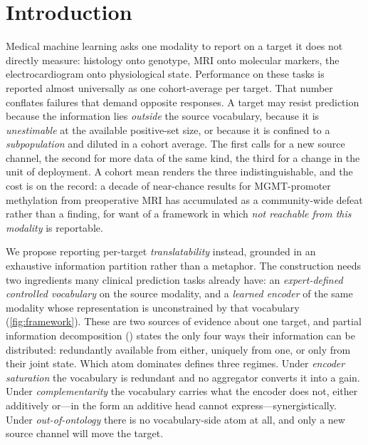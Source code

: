 
\section*{Introduction}

Medical machine learning asks one modality to report on a
target it does not directly measure: histology onto
genotype,\cite{coudray2018classification,kather2020pancancer} MRI onto
molecular markers,\cite{chang2018radiogenomics} the electrocardiogram onto
physiological state.\cite{attia2019ecg} Performance on these tasks is
reported almost universally as one cohort-average \auroc{} per target.
That number conflates failures that demand opposite responses. A
target may resist prediction because the information lies \emph{outside}
the source vocabulary, because it is \emph{unestimable} at the available
positive-set size, or because it is confined to a \emph{subpopulation}
and diluted in a cohort average. The first calls for
a new source channel, the second for more data of the same kind, the third
for a change in the unit of deployment. A cohort mean renders the three
indistinguishable, and the cost is on the record: a decade of near-chance
results for MGMT-promoter methylation from preoperative MRI has
accumulated as a community-wide defeat rather than a finding, for want
of a framework in which \emph{not reachable from this modality} is
reportable.\cite{kim2022mgmtvalidation,robinet2023mgmt,saeed2023mgmt}

We propose reporting per-target \emph{translatability} instead, grounded
in an exhaustive information partition rather than a metaphor. The
construction needs two ingredients many clinical prediction tasks
already have: an \emph{expert-defined controlled vocabulary} on the source
modality, and a \emph{learned encoder} of the same modality whose
representation is unconstrained by that vocabulary
(\cref{fig:framework}). These are two sources of evidence about one
target, and partial information decomposition
(\pid{})\cite{williams2010pid,bertschinger2014unique} states the only four
ways their information can be distributed: redundantly available
from either, uniquely from one, or only from their
joint state. Which atom dominates defines three regimes. Under
\emph{encoder saturation} the vocabulary is redundant and no aggregator
converts it into a gain. Under \emph{complementarity} the vocabulary
carries what the encoder does not, either additively or---in the form an
additive head cannot express---synergistically. Under
\emph{out-of-ontology} there is no vocabulary-side atom at all, and only a
new source channel will move the target.

